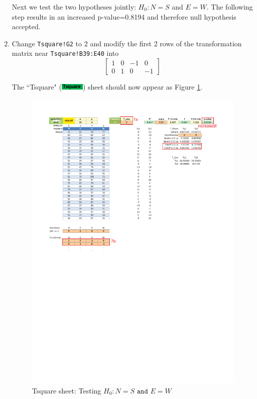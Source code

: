\documentclass[article]{jss}
\newcommand{\shtTsquare}{``Tsquare" (\includegraphics[height=8pt, keepaspectratio=true]{TsquareSheetTab_png}) }
\begin{document}
\begin{enumerate}
                
                Next we test the two hypotheses jointly: $H_0: N=S$ and $E=W$. The following step results in an increased p-value=0.8194 and therefore null hypothesis accepted.
                
                \item Change \texttt{Tsquare!G2} to 2 and modify the first 2 rows of the transformation matrix near \texttt{Tsquare!B39:E40} into 
                \[\left[ {\begin{array}{*{20}{c}}
                        1&0&-1&0 \\ 
                        0&1&0&-1
                        \end{array}} \right]\]
                
                
                The \shtTsquare sheet should now appear as Figure \ref{fig:Tsquare_N=S and E=W}.
                \begin{figure}[!tbh]
                        \includegraphics[width=\linewidth,keepaspectratio=true]{img/TsquareSheetOutput3_markup}
                        \vspace{-20pt}\centering\protect\caption{Tsquare sheet: Testing $H_0: N = S \texttt{ and } E=W$}\label{fig:Tsquare_N=S and E=W}
                \end{figure}
                

\end{enumerate}
\end{document}

